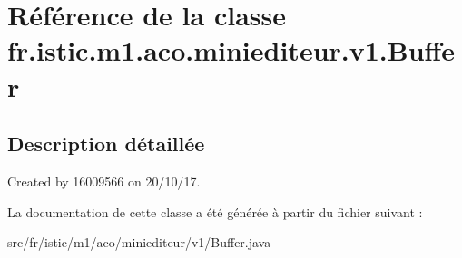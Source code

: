 \hypertarget{classfr_1_1istic_1_1m1_1_1aco_1_1miniediteur_1_1v1_1_1Buffer}{}\section{Référence de la classe fr.\+istic.\+m1.\+aco.\+miniediteur.\+v1.\+Buffer}
\label{classfr_1_1istic_1_1m1_1_1aco_1_1miniediteur_1_1v1_1_1Buffer}


\subsection{Description détaillée}
Created by 16009566 on 20/10/17. 

La documentation de cette classe a été générée à partir du fichier suivant \+:\begin{DoxyCompactItemize}
\item 
src/fr/istic/m1/aco/miniediteur/v1/Buffer.\+java\end{DoxyCompactItemize}
